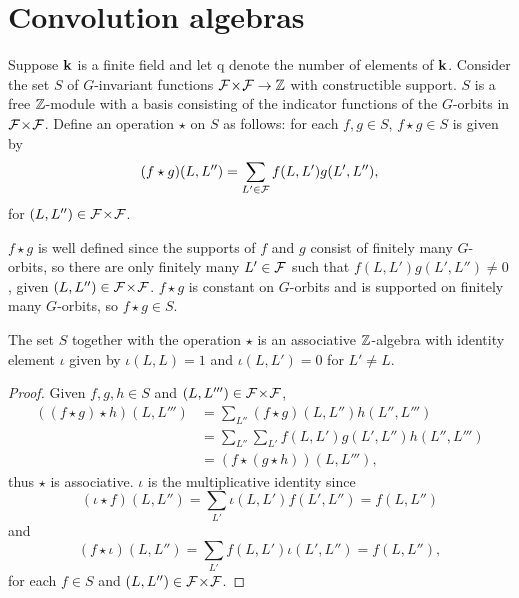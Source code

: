 \documentclass[a4paper, 11pt]{report}
\begin{document}
\section{Convolution algebras}

Suppose $\mathbf{k}$ is a finite field and let $\mathrm{q}$ denote the number of elements of $\mathbf{k}$. Consider the set $S$ of $G$-invariant functions ${\mathcal{F}\!\times\!\mathcal{F}}\to\mathbb{Z}$ with constructible support. $S$ is a free $\mathbb{Z}$-module with a basis consisting of the indicator functions of the $G$-orbits in ${\mathcal{F}\!\times\!\mathcal{F}}$. Define an operation $\star$ on $S$ as follows: for each $f,g\in S$, $f\star g\in S$ is given by
\begin{equation*}
(f\star g)(L,L'') = \sum_{L'\in\mathcal{F}} f(L,L')g(L',L''),
\end{equation*}
for $(L,L'')\in{\mathcal{F}\!\times\!\mathcal{F}}$. 

$f\star g$ is well defined since the supports of $f$ and $g$ consist of finitely many $G$-orbits, so there are only finitely many $L'\in\mathcal{F}$ such that $f(L,L')g(L',L'')\neq 0$, given $(L,L'')\in{\mathcal{F}\!\times\!\mathcal{F}}$. $f\star g$ is constant on $G$-orbits and is supported on finitely many $G$-orbits, so $f\star g\in S$.

\begin{lemma}\label{lemma:convolution-algebra}
The set $S$ together with the operation $\star$ is an associative $\mathbb{Z}$-algebra with identity element $\iota$ given by $\iota(L,L) = 1$ and $\iota(L,L')=0$ for $L'\neq L$.
\end{lemma}

\begin{proof}
Given $f,g,h\in S$ and $(L,L''')\in{\mathcal{F}\!\times\!\mathcal{F}}$,
\begin{align*}
((f\star g)\star h)(L,L''')
&= \sum_{L''} (f\star g)(L,L'')h(L'',L''')\\
&= \sum_{L''}\sum_{L'} f(L,L')g(L',L'')h(L'',L''')\\
&= (f\star (g\star h))(L,L'''),
\end{align*}
thus $\star$ is associative. $\iota$ is the multiplicative identity since
\begin{equation*}
(\iota\star f)(L,L'') = \sum_{L'}\iota(L,L')f(L',L'') = f(L,L'')
\end{equation*}
and
\begin{equation*}
(f\star\iota)(L,L'') = \sum_{L'}f(L,L')\iota(L',L'') = f(L,L''),
\end{equation*}
for each $f\in S$ and $(L,L'')\in{\mathcal{F}\!\times\!\mathcal{F}}$.
\end{proof}
\end{document}
